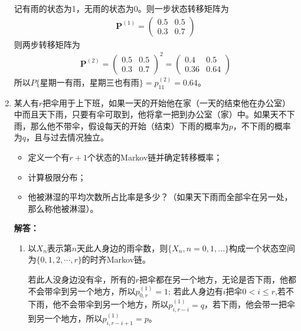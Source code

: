 \begin{enumerate}
	      记有雨的状态为1，无雨的状态为0。则一步状态转移矩阵为
	      \begin{align*}
		      \mathbf{P}^{(1)}=
		      \begin{pmatrix}
			      0.5 & 0.5 \\
			      0.3 & 0.7
		      \end{pmatrix}
	      \end{align*}
	      则两步转移矩阵为
	      \begin{align*}
		      \mathbf{P}^{(2)}=
		      \begin{pmatrix}
			      0.5 & 0.5 \\
			      0.3 & 0.7
		      \end{pmatrix}^2
		      =\begin{pmatrix}
			       0.4  & 0.5  \\
			       0.36 & 0.64
		       \end{pmatrix}
	      \end{align*}
	      所以\(P\{\)星期一有雨，星期三也有雨\(\}=p^{(2)}_{11}=0.64\)。

	\item 某人有\(r\)把伞用于上下班，如果一天的开始他在家（一天的结束他在办公室）中而且天下雨，只要有伞可取到，他将拿一把到办公室（家）中。如果天不下雨，那么他不带伞，假设每天的开始（结束）下雨的概率为\(p\)，不下雨的概率为\(q\)，且与过去情况独立。
	      \begin{itemize}[\bfseries (1)]
		      \item 定义一个有\(r+1\)个状态的Markov链并确定转移概率；
		      \item 计算极限分布；
		      \item 他被淋湿的平均次数所占比率是多少？（如果天下雨而全部伞在另一处，那么称他被淋湿）。
	      \end{itemize}

	      \textbf{解答：}\begin{enumerate}[\bfseries (1)]
		      \item 以\(X_n\)表示第\(n\)天此人身边的雨伞数，则\(\{X_n,n=0,1,\ldots \}\)构成一个状态空间为\(\{0,1,2,\cdots ,r\}\)的时齐Markov链。

		            若此人没身边没有伞，所有的\(r\)把伞都在另一个地方，无论是否下雨，他都不会带伞到另一个地方，所以\(p_{0,r}^{(1)}=1\);
		            若此人身边有\(i\)把伞\(0<i\leqslant r\),若不下雨，他不会带伞到另一个地方，所以\(p_{i,r-i}^{(1)}=q\)，若下雨，他会带一把伞到另一个地方，所以\(p_{i,r-i+1}^{(1)}=p\)。


\end{enumerate}
\end{enumerate}
